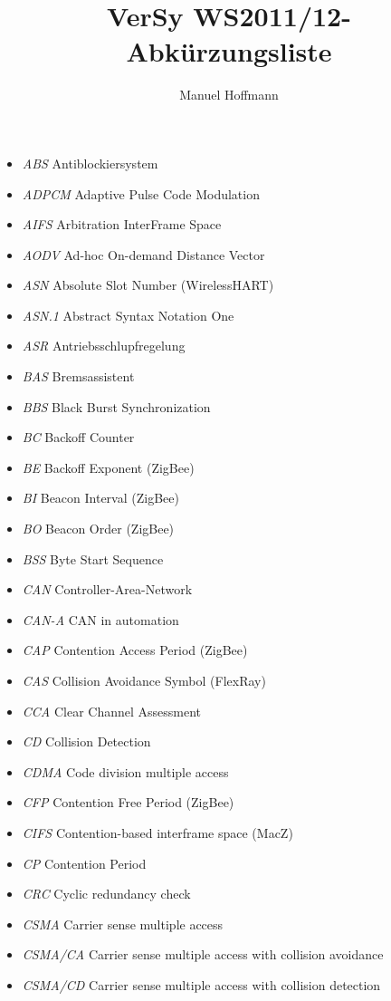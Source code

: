 \documentclass{article}
\title{VerSy WS2011/12- Abkürzungsliste}
\author{Manuel Hoffmann}
\begin{document}
\maketitle

\begin{itemize}
	\item \emph{ABS} Antiblockiersystem
	\item \emph{ADPCM} Adaptive Pulse Code Modulation
	\item \emph{AIFS} Arbitration InterFrame Space
	\item \emph{AODV} Ad-hoc On-demand Distance Vector
	\item \emph{ASN} Absolute Slot Number (WirelessHART)
	\item \emph{ASN.1} Abstract Syntax Notation One
	\item \emph{ASR} Antriebsschlupfregelung
	\item \emph{BAS} Bremsassistent
	\item \emph{BBS} Black Burst Synchronization
	\item \emph{BC} Backoff Counter
	\item \emph{BE} Backoff Exponent (ZigBee)
	\item \emph{BI} Beacon Interval (ZigBee)
	\item \emph{BO} Beacon Order (ZigBee)
	\item \emph{BSS} Byte Start Sequence
	\item \emph{CAN} Controller-Area-Network
	\item \emph{CAN-A} CAN in automation
	\item \emph{CAP} Contention Access Period (ZigBee)
	\item \emph{CAS} Collision Avoidance Symbol (FlexRay)
	\item \emph{CCA} Clear Channel Assessment
	\item \emph{CD} Collision Detection
	\item \emph{CDMA} Code division multiple access
	\item \emph{CFP} Contention Free Period (ZigBee)
	\item \emph{CIFS} Contention-based interframe space (MacZ)
	\item \emph{CP} Contention Period
	\item \emph{CRC} Cyclic redundancy check
	\item \emph{CSMA} Carrier sense multiple access
	\item \emph{CSMA/CA} Carrier sense multiple access with collision avoidance
	\item \emph{CSMA/CD} Carrier sense multiple access with collision detection

\end{itemize}
\end{document}
